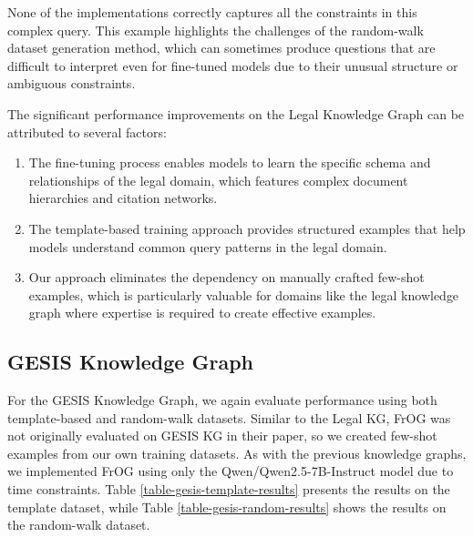 None of the implementations correctly captures all the constraints in this complex query. This example highlights the challenges of the random-walk dataset generation method, which can sometimes produce questions that are difficult to interpret even for fine-tuned models due to their unusual structure or ambiguous constraints.

The significant performance improvements on the Legal Knowledge Graph can be attributed to several factors:

\begin{enumerate}
    \item The fine-tuning process enables models to learn the specific schema and relationships of the legal domain, which features complex document hierarchies and citation networks.
    \item The template-based training approach provides structured examples that help models understand common query patterns in the legal domain.
    \item Our approach eliminates the dependency on manually crafted few-shot examples, which is particularly valuable for domains like the legal knowledge graph where expertise is required to create effective examples.
\end{enumerate}

\subsection{GESIS Knowledge Graph}
\label{gesis-results}

For the GESIS Knowledge Graph, we again evaluate performance using both template-based and random-walk datasets. Similar to the Legal KG, FrOG was not originally evaluated on GESIS KG in their paper, so we created few-shot examples from our own training datasets. As with the previous knowledge graphs, we implemented FrOG using only the Qwen/Qwen2.5-7B-Instruct model due to time constraints. Table \ref{table-gesis-template-results} presents the results on the template dataset, while Table \ref{table-gesis-random-results} shows the results on the random-walk dataset.

